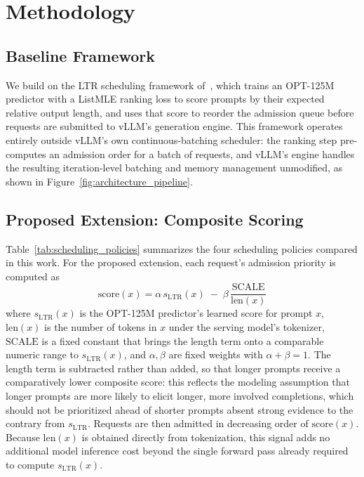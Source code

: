 \section{Methodology}
\label{sec:methodology}

\subsection{Baseline Framework}

We build on the LTR scheduling framework of~\cite{fu2024efficient}, which
trains an OPT-125M predictor with a ListMLE ranking loss to score prompts by
their expected relative output length, and uses that score to reorder the
admission queue before requests are submitted to vLLM's generation engine.
This framework operates entirely outside vLLM's own continuous-batching
scheduler: the ranking step pre-computes an admission order for a batch of
requests, and vLLM's engine handles the resulting iteration-level batching and
memory management unmodified, as shown in Figure~\ref{fig:architecture_pipeline}.

\subsection{Proposed Extension: Composite Scoring}

Table~\ref{tab:scheduling_policies} summarizes the four scheduling policies
compared in this work. For the proposed extension, each request's admission
priority is computed as
\begin{equation}
    \mathrm{score}(x) = \alpha \, s_{\mathrm{LTR}}(x) \;-\; \beta \, \frac{\mathrm{SCALE}}{\mathrm{len}(x)}
    \label{eq:composite-score}
\end{equation}
where $s_{\mathrm{LTR}}(x)$ is the OPT-125M predictor's learned score for
prompt $x$, $\mathrm{len}(x)$ is the number of tokens in $x$ under the serving
model's tokenizer, $\mathrm{SCALE}$ is a fixed constant that brings the
length term onto a comparable numeric range to $s_{\mathrm{LTR}}(x)$, and
$\alpha, \beta$ are fixed weights with $\alpha + \beta = 1$. The length term
is subtracted rather than added, so that longer prompts receive a
comparatively lower composite score: this reflects the modeling assumption
that longer prompts are more likely to elicit longer, more involved
completions, which should not be prioritized ahead of shorter prompts absent
strong evidence to the contrary from $s_{\mathrm{LTR}}$. Requests are then
admitted in decreasing order of $\mathrm{score}(x)$. Because
$\mathrm{len}(x)$ is obtained directly from tokenization, this signal adds no
additional model inference cost beyond the single forward pass already
required to compute $s_{\mathrm{LTR}}(x)$.

